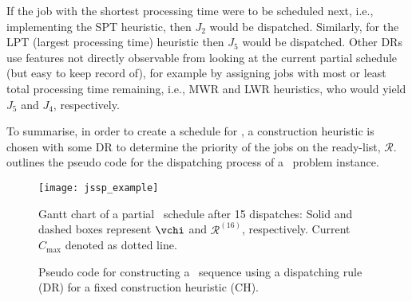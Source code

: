 If the job with the shortest processing time were to be scheduled next, i.e., implementing the SPT heuristic, then $J_2$ would be dispatched. Similarly, for the LPT (largest processing time) heuristic then $J_5$ would be dispatched. 
Other DRs use features not directly observable from looking at the current partial schedule (but easy to keep record of), for example by assigning jobs with most or least total processing time remaining, i.e., MWR and LWR heuristics, who would yield $J_5$ and $J_4$, respectively.

To summarise, in order to create a schedule for \JSP, a construction heuristic is chosen with some DR to determine the priority of the jobs on the ready-list, $\mathcal{R}$.  outlines the pseudo code for the dispatching process of a \JSP\ problem instance.



\begin{figure}[p]
\texttt{[image: jssp\_example]}
\caption[Gantt chart of a partial \JSP\ schedule]{Gantt chart of a partial \JSP\ schedule after 15 dispatches: Solid and dashed boxes represent $\vchi$ and $\mathcal{R}^{(16)}$, respectively. Current $C_{\max}$ denoted as dotted line.}
\label{fig:example}
\end{figure}

\begin{figure}[p]\centering 
{}
\caption{Pseudo code for constructing a \JSP\ sequence using a dispatching rule (DR) for a fixed construction heuristic (CH).}\label{fig:pseudocode}
\end{figure}


